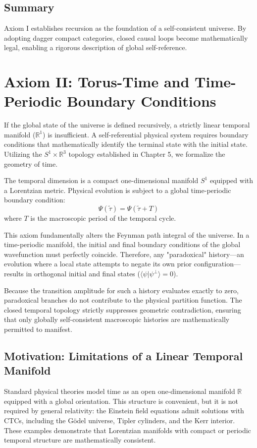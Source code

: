 \documentclass[12pt,openany]{book}
\theoremstyle{plain}
\theoremstyle{definition}
\theoremstyle{remark}
\begin{document}
\section{Summary}
Axiom I establishes recursion as the foundation of a self-consistent universe. By adopting dagger compact categories, closed causal loops become mathematically legal, enabling a rigorous description of global self-reference.

\chapter{Axiom II: Torus-Time and Time-Periodic Boundary Conditions}

If the global state of the universe is defined recursively, a strictly linear temporal manifold ($\mathbb{R}^1$) is insufficient. A self-referential physical system requires boundary conditions that mathematically identify the terminal state with the initial state. Utilizing the $S^1 \times \mathbb{R}^3$ topology established in Chapter 5, we formalize the geometry of time.

The temporal dimension is a compact one-dimensional manifold $S^1$ equipped with a Lorentzian metric. Physical evolution is subject to a global time-periodic boundary condition:
$$\Psi(\tilde{\tau}) = \Psi(\tilde{\tau} + T)$$
where $T$ is the macroscopic period of the temporal cycle.

This axiom fundamentally alters the Feynman path integral of the universe. In a time-periodic manifold, the initial and final boundary conditions of the global wavefunction must perfectly coincide. Therefore, any "paradoxical" history—an evolution where a local state attempts to negate its own prior configuration—results in orthogonal initial and final states ($\langle \psi | \psi^\perp \rangle = 0$).

Because the transition amplitude for such a history evaluates exactly to zero, paradoxical branches do not contribute to the physical partition function. The closed temporal topology strictly suppresses geometric contradiction, ensuring that only globally self-consistent macroscopic histories are mathematically permitted to manifest.

\section{Motivation: Limitations of a Linear Temporal Manifold}
Standard physical theories model time as an open one-dimensional manifold
$\mathbb{R}$ equipped with a global orientation. This structure is convenient,
but it is not required by general relativity: the Einstein field equations admit
solutions with CTCs, including the Gödel universe,
Tipler cylinders, and the Kerr interior. These examples demonstrate that
Lorentzian manifolds with compact or periodic temporal structure are
mathematically consistent.
\end{document}
